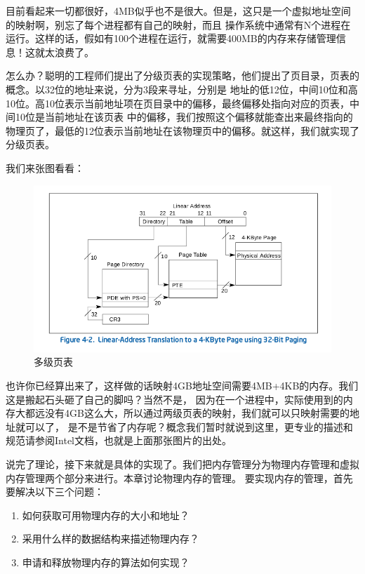 \par 目前看起来一切都很好，4MB似乎也不是很大。但是，这只是一个虚拟地址空间的映射啊，别忘了每个进程都有自己的映射，而且\allowbreak
操作系统中通常有N个进程在运行。这样的话，假如有100个进程在运行，就需要400MB的内存来存储管理信息！这就太浪费了。

\par 怎么办？聪明的工程师们提出了分级页表的实现策略，他们提出了页目录，页表的概念。以32位的地址来说，分为3段来寻址，分别是\allowbreak
地址的低12位，中间10位和高10位。高10位表示当前地址项在页目录中的偏移，最终偏移处指向对应的页表，中间10位是当前地址在该页表\allowbreak
中的偏移，我们按照这个偏移就能查出来最终指向的物理页了，最低的12位表示当前地址在该物理页中的偏移。就这样，我们就实现了分级页表。

\par 我们来张图看看：

\begin{figure}[ht]
      \centering
      \includegraphics[scale=0.5]{picture/chapt9/PAGE.png}
      \caption{多级页表}
\end{figure}

\par 也许你已经算出来了，这样做的话映射4GB地址空间需要4MB+4KB的内存。我们这是搬起石头砸了自己的脚吗？当然不是，\allowbreak
因为在一个进程中，实际使用到的内存大都远没有4GB这么大，所以通过两级页表的映射，我们就可以只映射需要的地址就可以了，\allowbreak
是不是节省了内存呢？概念我们暂时就说到这里，更专业的描述和规范请参阅Intel文档，也就是上面那张图片的出处。

\par 说完了理论，接下来就是具体的实现了。我们把内存管理分为物理内存管理和虚拟内存管理两个部分来进行。本章讨论物理内存的管理。\allowbreak
要实现内存的管理，首先要解决以下三个问题：

\begin{mdframed}
	\begin{enumerate}
		\item 如何获取可用物理内存的大小和地址？
		\item 采用什么样的数据结构来描述物理内存？
		\item 申请和释放物理内存的算法如何实现？
	\end{enumerate}
\end{mdframed}

